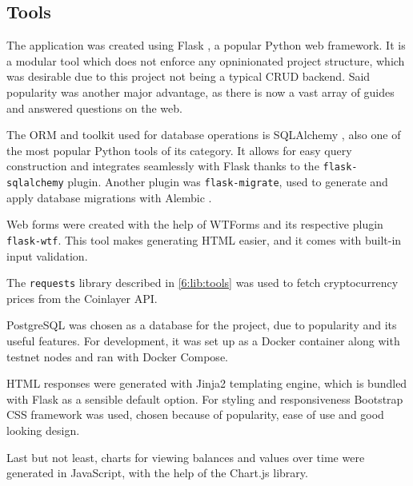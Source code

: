 \subsection{Tools}

The application was created using Flask \cite{flask}, a popular Python web framework.
It is a modular tool which does not enforce any opninionated project structure,
which was desirable due to this project not being a typical CRUD backend.
Said popularity was another major advantage,
as there is now a vast array of guides and answered questions on the web.

The ORM and toolkit used for database operations is SQLAlchemy \cite{sa},
also one of the most popular Python tools of its category.
It allows for easy query construction and integrates seamlessly with Flask
thanks to the \texttt{flask-sqlalchemy} plugin.
Another plugin was \texttt{flask-migrate},
used to generate and apply database migrations with Alembic \cite{alembic}.

Web forms were created with the help of WTForms \cite{wtforms}
and its respective plugin \texttt{flask-wtf}.
This tool makes generating HTML easier, and it comes with built-in
input validation.

The \texttt{requests} library described
in \ref{6:lib:tools} was used to fetch cryptocurrency prices
from the Coinlayer API.

PostgreSQL \cite{postgres} was chosen as a database for the project,
due to popularity and its useful features.
For development, it was set up as a Docker container
along with testnet nodes and ran with Docker Compose.

HTML responses were generated with Jinja2 templating engine,
which is bundled with Flask as a sensible default option.
For styling and responsiveness Bootstrap \cite{bootstrap} CSS \cite{css} framework was used,
chosen because of popularity, ease of use and good looking design.

Last but not least, charts for viewing balances and values over time
were generated in JavaScript,
with the help of the Chart.js \cite{chartjs} library.
